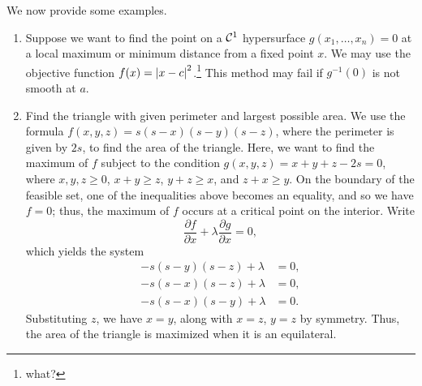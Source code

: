 \noindent We now provide some examples.
\begin{enumerate}[label=(\alph*)]
    \item Suppose we want to find the point on a $\mathcal C^1$ hypersurface $g(x_1, \dots, x_n) = 0$ at a local maximum or minimum distance from a fixed point $x$. We may use the objective function $f(x) = \left\lvert x - c \right\rvert^2$.\footnote{what?} This method may fail if $g^{-1}(0)$ is not smooth at $a$.
    \item Find the triangle with given perimeter and largest possible area. We use the formula $f(x, y, z) = s(s - x)(s - y)(s - z)$, where the perimeter is given by $2s$, to find the area of the triangle.
    \medskip\newline
    Here, we want to find the maximum of $f$ subject to the condition $g(x, y, z) = x + y + z - 2s = 0$, where $x, y, z \geq 0$, $x + y \geq z$, $y + z \geq x$, and $z + x \geq y$. On the boundary of the feasible set, one of the inequalities above becomes an equality, and so we have $f = 0$; thus, the maximum of $f$ occurs at a critical point on the interior. Write
    \[ \frac{\partial f}{\partial x} + \lambda \frac{\partial g}{\partial x} = 0, \]
    which yields the system
    \begin{align*}
        -s(s - y)(s - z) + \lambda &= 0, \\
        -s(s - x)(s - z) + \lambda &= 0, \\
        -s(s - x)(s - y) + \lambda &= 0.
    \end{align*}
    Substituting $z$, we have $x = y$, along with $x = z$, $y = z$ by symmetry. Thus, the area of the triangle is maximized when it is an equilateral.
\end{enumerate}